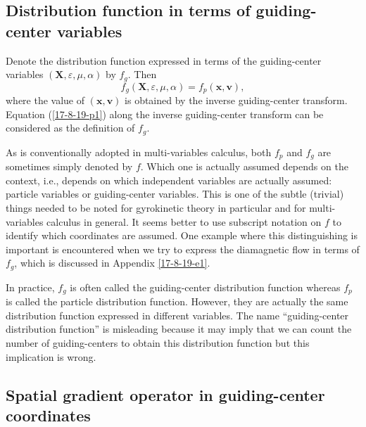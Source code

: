 \documentclass{llncs}
\begin{document}
\subsection{Distribution function in terms of guiding-center variables}

Denote the distribution function expressed in terms of the guiding-center
variables $(\mathbf{X}, \varepsilon, \mu, \alpha)$ by $f_g$. Then
\begin{equation}
  \label{17-8-19-p1} f_g (\mathbf{X}, \varepsilon, \mu, \alpha) = f_p
  (\mathbf{x}, \mathbf{v}),
\end{equation}
where the value of $(\mathbf{x}, \mathbf{v})$ is obtained by the inverse
guiding-center transform. Equation (\ref{17-8-19-p1}) along the inverse
guiding-center transform can be considered as the definition of $f_g$.

As is conventionally adopted in multi-variables calculus, both $f_p$ and $f_g$
are sometimes simply denoted by $f$. Which one is actually assumed depends on
the context, i.e., depends on which independent variables are actually
assumed: particle variables or guiding-center variables. This is one of the
subtle (trivial) things needed to be noted for gyrokinetic theory in
particular and for multi-variables calculus in general. It seems better to use
subscript notation on $f$ to identify which coordinates are assumed. One
example where this distinguishing is important is encountered when we try to
express the diamagnetic flow in terms of $f_g$, which is discussed in Appendix
\ref{17-8-19-e1}.

In practice, $f_g$ is often called the guiding-center distribution function
whereas $f_p$ is called the particle distribution function. However, they are
actually the same distribution function expressed in different variables. The
name ``guiding-center distribution function'' is misleading because it may
imply that we can count the number of guiding-centers to obtain this
distribution function but this implication is wrong.

\subsection{Spatial gradient operator in guiding-center coordinates}
\end{document}
